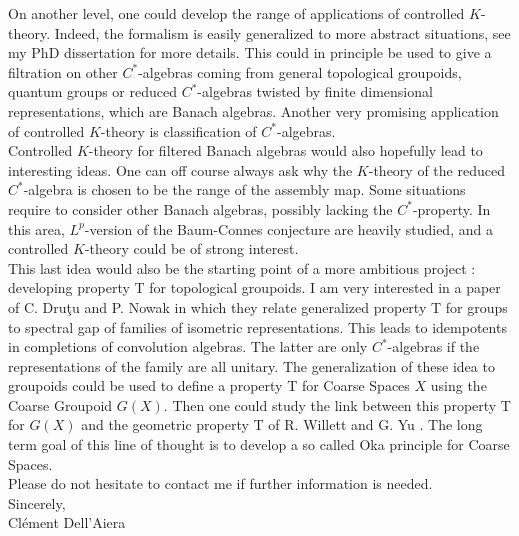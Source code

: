 On another level, one could develop the range of applications of controlled $K$-theory. Indeed, the formalism is easily generalized to more abstract situations, see my PhD dissertation for more details. This could in principle be used to give a filtration on other $C^*$-algebras coming from general topological groupoids, quantum groups or reduced $C^*$-algebras twisted by finite dimensional representations, which are Banach algebras. Another very promising application of controlled $K$-theory is classification of $C^*$-algebras. \\

Controlled $K$-theory for filtered Banach algebras would also hopefully lead to interesting ideas. One can off course always ask why the $K$-theory of the reduced $C^*$-algebra is chosen to be the range of the assembly map. Some situations require to consider other Banach algebras, possibly lacking the $C^*$-property. In this area, $L^p$-version of the Baum-Connes conjecture are heavily studied, and a controlled $K$-theory could be of strong interest.\\

This last idea would also be the starting point of a more ambitious project : developing property T for topological groupoids. I am very interested in a paper of C. Dru{\c{t}}u and P. Nowak \cite{DrutuNowak} in which they relate generalized property T for groups to spectral gap of families of isometric representations. This leads to idempotents in completions of convolution algebras. The latter are only $C^*$-algebras if the representations of the family are all unitary. The generalization of these idea to groupoids could be used to define a property T for Coarse Spaces $X$ using the Coarse Groupoid $G(X)$. Then one could study the link between this property T for $G(X)$ and the geometric property T of R. Willett and G. Yu \cite{WY}. The long term goal of this line of thought is to develop a so called Oka principle for Coarse Spaces.\\

Please do not hesitate to contact me if further information is needed.\\

Sincerely,\\
Clément Dell’Aiera

